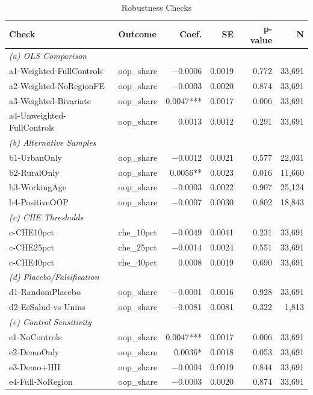 \begin{table}[htbp]
\centering
\caption{Robustness Checks}
\label{tab:robustness}
\scriptsize
\begin{tabular}{llrrrr}
\toprule
Check & Outcome & Coef. & SE & p-value & N \\
\midrule
\multicolumn{6}{l}{\textit{(a) OLS Comparison}} \\
  a1-Weighted-FullControls & oop\_share & $-$0.0006 & 0.0019 & 0.772 & 33,691 \\
  a2-Weighted-NoRegionFE & oop\_share & $-$0.0003 & 0.0020 & 0.874 & 33,691 \\
  a3-Weighted-Bivariate & oop\_share & 0.0047*** & 0.0017 & 0.006 & 33,691 \\
  a4-Unweighted-FullControls & oop\_share & 0.0013 & 0.0012 & 0.291 & 33,691 \\
\multicolumn{6}{l}{\textit{(b) Alternative Samples}} \\
  b1-UrbanOnly & oop\_share & $-$0.0012 & 0.0021 & 0.577 & 22,031 \\
  b2-RuralOnly & oop\_share & 0.0056** & 0.0023 & 0.016 & 11,660 \\
  b3-WorkingAge & oop\_share & $-$0.0003 & 0.0022 & 0.907 & 25,124 \\
  b4-PositiveOOP & oop\_share & $-$0.0007 & 0.0030 & 0.802 & 18,843 \\
\multicolumn{6}{l}{\textit{(c) CHE Thresholds}} \\
  c-CHE10pct & che\_10pct & $-$0.0049 & 0.0041 & 0.231 & 33,691 \\
  c-CHE25pct & che\_25pct & $-$0.0014 & 0.0024 & 0.551 & 33,691 \\
  c-CHE40pct & che\_40pct & 0.0008 & 0.0019 & 0.690 & 33,691 \\
\multicolumn{6}{l}{\textit{(d) Placebo/Falsification}} \\
  d1-RandomPlacebo & oop\_share & $-$0.0001 & 0.0016 & 0.928 & 33,691 \\
  d2-EsSalud-vs-Unins & oop\_share & $-$0.0081 & 0.0081 & 0.322 & 1,813 \\
\multicolumn{6}{l}{\textit{(e) Control Sensitivity}} \\
  e1-NoControls & oop\_share & 0.0047*** & 0.0017 & 0.006 & 33,691 \\
  e2-DemoOnly & oop\_share & 0.0036* & 0.0018 & 0.053 & 33,691 \\
  e3-Demo+HH & oop\_share & $-$0.0004 & 0.0019 & 0.844 & 33,691 \\
  e4-Full-NoRegion & oop\_share & $-$0.0003 & 0.0020 & 0.874 & 33,691 \\

\end{tabular}
\end{table}
